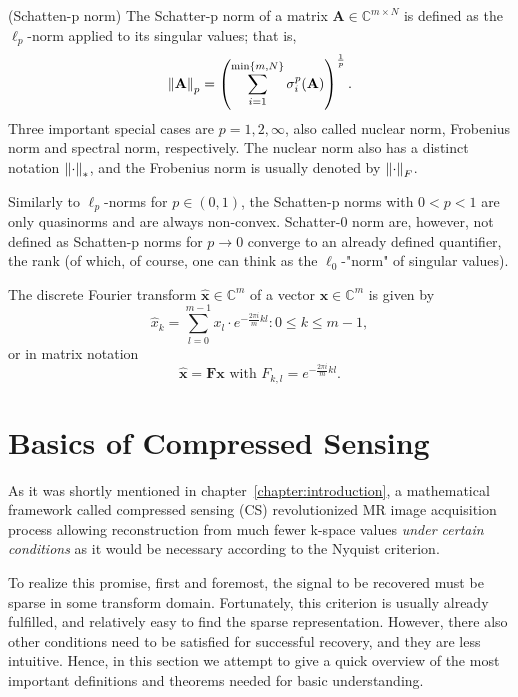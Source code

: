 \begin{tight_equations}
\begin{definition}(Schatten-p norm)
The Schatter-p norm of a matrix $\mathbf{A} \in \mathbb{C}^{m \times N}$ is defined as the $\ell_p$-norm applied to its singular values; that is,
\[\left\lVert\mathbf{A}\right\rVert_p = \left(\sum_{i=1}^{\min\{m,N\}}\sigma_i^p(\mathbf{A})\right)^\frac{1}{p}.\]
Three important special cases are $p = 1, 2, \infty$, also called nuclear norm, Frobenius norm and spectral norm, respectively. The nuclear norm also has a distinct notation $\left\lVert\cdot\right\rVert_*$, and the Frobenius norm is usually denoted by $\left\lVert\cdot\right\rVert_F$.
\end{definition}

\begin{remark}
Similarly to $\ell_p$-norms for $p \in (0,1)$, the Schatten-p norms with $0 < p < 1$ are only quasinorms and are always non-convex. Schatter-0 norm are, however, not defined as Schatten-p norms for $p \rightarrow 0$ converge to an already defined quantifier, the rank (of which, of course, one can think as the $\ell_0$-"norm" of singular values).
\end{remark}

\begin{definition}
The discrete Fourier transform $\mathbf{\hat{x}} \in \mathbb{C}^m$ of a vector $\mathbf{x} \in \mathbb{C}^m$ is given by
\[\hat{x}_k = \sum_{l = 0}^{m-1} x_l \cdot e^{-\frac{2\pi i}{m}kl} : 0 \le k \le m-1,\]
or in matrix notation
\[\mathbf{\hat{x}} = \mathbf{Fx} \text{ with } F_{k,l} = e^{-\frac{2\pi i}{m}kl}.\]
\end{definition}

\end{tight_equations}

\section{Basics of Compressed Sensing}
As it was shortly mentioned in chapter~\ref{chapter:introduction}, a mathematical framework called compressed sensing (CS) revolutionized MR image acquisition process allowing reconstruction from much fewer k-space values \textit{under certain conditions} as it would be necessary according to the Nyquist criterion.

To realize this promise, first and foremost, the signal to be recovered must be sparse in some transform domain.
Fortunately, this criterion is usually already fulfilled, and relatively easy to find the sparse representation. However, there also other conditions need to be satisfied for successful recovery, and they are less intuitive. Hence, in this section we attempt to give a quick overview of the most important definitions and theorems needed for basic understanding.

